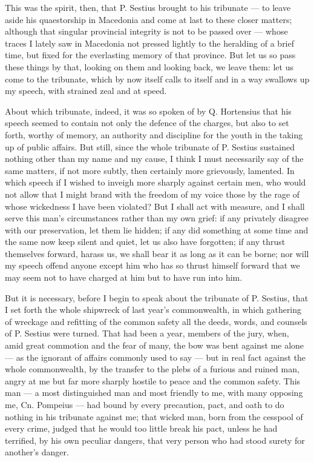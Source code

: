  This was the spirit, then, that P. Sestius brought to his tribunate --- to leave aside his quaestorship in Macedonia and come at last to these closer matters; although that singular provincial integrity is not to be passed over --- whose traces I lately saw in Macedonia not pressed lightly to the heralding of a brief time, but fixed for the everlasting memory of that province. But let us so pass these things by that, looking on them and looking back, we leave them: let us come to the tribunate, which by now itself calls to itself and in a way swallows up my speech, with strained zeal and at speed.

 About which tribunate, indeed, it was so spoken of by Q. Hortensius that his speech seemed to contain not only the defence of the charges, but also to set forth, worthy of memory, an authority and discipline for the youth in the taking up of public affairs. But still, since the whole tribunate of P. Sestius sustained nothing other than my name and my cause, I think I must necessarily say of the same matters, if not more subtly, then certainly more grievously, lamented. In which speech if I wished to inveigh more sharply against certain men, who would not allow that I might brand with the freedom of my voice those by the rage of whose wickedness I have been violated? But I shall act with measure, and I shall serve this man's circumstances rather than my own grief: if any privately disagree with our preservation, let them lie hidden; if any did something at some time and the same now keep silent and quiet, let us also have forgotten; if any thrust themselves forward, harass us, we shall bear it as long as it can be borne; nor will my speech offend anyone except him who has so thrust himself forward that we may seem not to have charged at him but to have run into him.

 But it is necessary, before I begin to speak about the tribunate of P. Sestius, that I set forth the whole shipwreck of last year's commonwealth, in which gathering of wreckage and refitting of the common safety all the deeds, words, and counsels of P. Sestius were turned. That had been a year, members of the jury, when, amid great commotion and the fear of many, the bow was bent against me alone --- as the ignorant of affairs commonly used to say --- but in real fact against the whole commonwealth, by the transfer to the plebs of a furious and ruined man, angry at me but far more sharply hostile to peace and the common safety. This man --- a most distinguished man and most friendly to me, with many opposing me, Cn. Pompeius --- had bound by every precaution, pact, and oath to do nothing in his tribunate against me; that wicked man, born from the cesspool of every crime, judged that he would too little break his pact, unless he had terrified, by his own peculiar dangers, that very person who had stood surety for another's danger.

